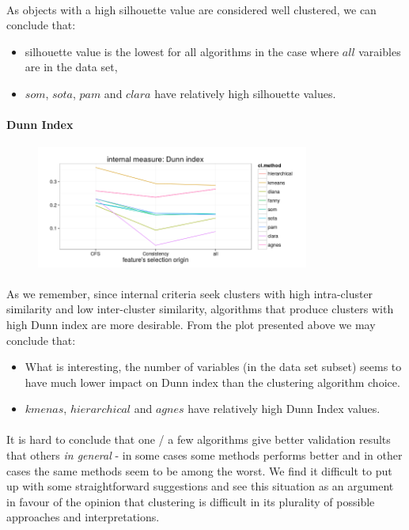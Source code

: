 \documentclass[10pt]{article}\usepackage[]{graphicx}\usepackage[]{color}
\begin{document}
\paragraph{} 
As objects with a high silhouette value are
considered well clustered, we can conclude that:
\begin{itemize}
\item silhouette value is the lowest for all algorithms in the case 
where $all$ varaibles are in the data set, 
\item $som$, $sota$, $pam$ and $clara$ have relatively high silhouette values. 
\end{itemize}


\paragraph{Dunn Index} 
\begin{figure}[h]
\centering
\includegraphics[width=0.8\textwidth]{Plots2/comp1-dunn.png}
\end{figure}
\paragraph{} 
As we remember, since internal criteria seek clusters with high intra-cluster similarity and low inter-cluster similarity, algorithms that produce clusters with high Dunn index are more desirable. From the plot presented above we may conclude that: 
\begin{itemize}
\item What is interesting, the number of variables (in the data set subset) seems to have much lower impact on Dunn index than the clustering algorithm choice. 
\item $kmenas$, $hierarchical$ and $agnes$ have relatively high  Dunn Index values.
\end{itemize}

\paragraph{}
It is hard to conclude that one / a few algorithms give better validation results
that others \textit{in general} - in some cases some methods performs better 
and in other cases the same methods seem to be among the worst. 
We find it difficult to put up with some straightforward suggestions and 
see this situation as an argument in favour of the opinion that clustering is difficult in 
its plurality of possible approaches and interpretations.
\end{document}
